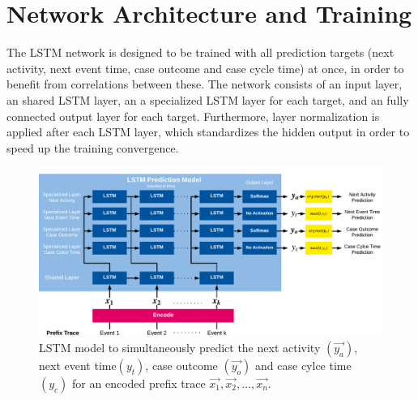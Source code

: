 \section{Network Architecture and Training}

The LSTM network is designed to be trained with all prediction targets (next activity, next event time, case outcome and case cycle time) at once, in order to benefit from correlations between these.
The network consists of an input layer, an shared LSTM layer, an a specialized LSTM layer for each target, and an fully connected output layer for each target.
Furthermore, layer normalization \cite{DBLP:journals/corr/BaKH16} is applied after each LSTM layer, which standardizes the hidden output in order to speed up the training convergence.

\begin{figure}[!htbp]
	\centering
	\includegraphics[width=\textwidth]{figures/network}
	\caption[LSTM model for text-aware process prediction]{LSTM model to simultaneously predict the next activity $(\vec{y_a})$, next event time$(y_t)$, case outcome $(\vec{y_o})$ and case cylce time $(y_c)$ for an encoded prefix trace $\vec{x_1}, \vec{x_2}, \dots, \vec{x_n}$.}
	\label{fig:network}
\end{figure}


